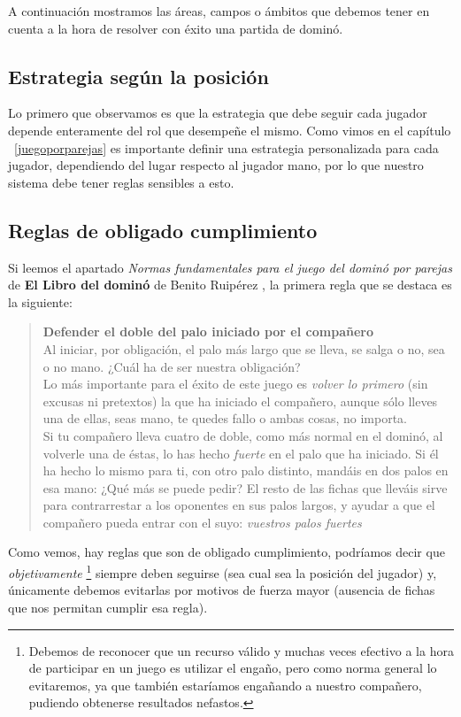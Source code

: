 A continuación mostramos las áreas, campos o ámbitos que debemos tener en cuenta a la hora de resolver con éxito
una partida de dominó.

\subsection{Estrategia según la posición}

Lo primero que observamos es que la estrategia que debe seguir cada jugador depende enteramente del rol que desempeñe el mismo.
Como vimos en el capítulo ~\ref{juegoporparejas} es importante definir una estrategia personalizada para cada jugador,
dependiendo del lugar respecto al jugador mano, por lo que nuestro sistema debe tener reglas sensibles a esto.

\subsection{Reglas de obligado cumplimiento}

Si leemos el apartado \emph{Normas fundamentales para el juego del dominó por parejas} de \textbf{El Libro del dominó} de
Benito Ruipérez \cite{mora90}, la primera regla que se destaca es la siguiente:

\begin{quote}
    \textbf{Defender el doble del palo iniciado por el compañero} \\
    Al iniciar, por obligación, el palo más largo que se lleva, se salga o no, sea o no mano. ¿Cuál ha de ser nuestra
    obligación?\\
    Lo más importante para el éxito de este juego es \emph{volver lo primero} (sin excusas ni pretextos) la que ha iniciado
    el compañero, aunque sólo lleves una de ellas, seas mano, te quedes fallo o ambas cosas, no importa.\\
    Si tu compañero lleva cuatro de doble, como más normal en el dominó, al volverle una de éstas, lo has hecho \emph{fuerte}
    en el palo que ha iniciado. Si él ha hecho lo mismo para ti, con otro palo distinto, mandáis en dos palos en
    esa mano: ¿Qué más se puede pedir? El resto de las fichas que lleváis sirve para contrarrestar a los oponentes en sus
    palos largos, y ayudar a que el compañero pueda entrar con el suyo: \emph{vuestros palos fuertes}
\end{quote}

Como vemos, hay reglas que son de obligado cumplimiento, podríamos decir que \emph{objetivamente} \footnote{Debemos de
reconocer que un recurso válido y muchas veces efectivo a la hora de participar en un juego es utilizar el engaño, pero
como norma general lo evitaremos, ya que también estaríamos engañando a nuestro compañero, pudiendo obtenerse resultados
nefastos.} siempre deben seguirse (sea cual sea la posición del jugador) y, únicamente debemos evitarlas por motivos de
fuerza mayor (ausencia de fichas que nos permitan cumplir esa regla).

